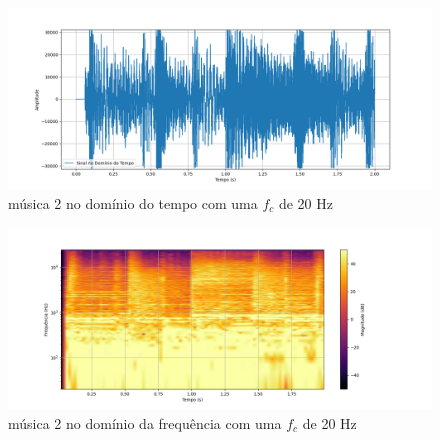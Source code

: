 \begin{anexosenv}
\begin{figure}[h]
	\centering
    \includegraphics[width=\textwidth]{figuras/fig38.png}
	\caption{música 2 no domínio do tempo com uma $f_c$ de 20 Hz}
	\label{fig38}
\end{figure}

\begin{figure}[h]
	\centering
    \includegraphics[width=\textwidth]{figuras/fig39.png}
	\caption{música 2 no domínio da frequência com uma $f_c$ de 20 Hz}
	\label{fig39}
\end{figure}

\end{anexosenv}
